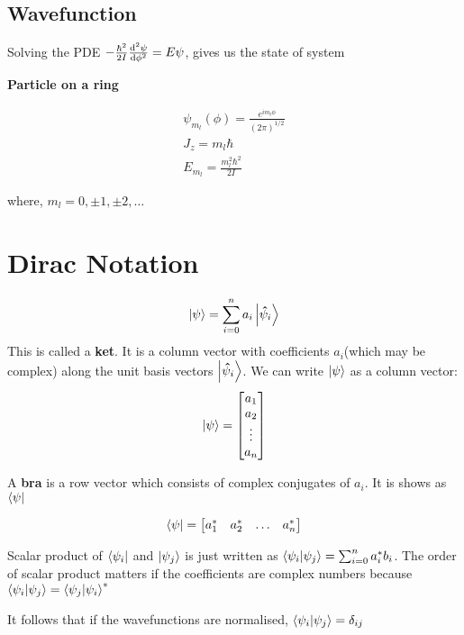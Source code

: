 \documentclass[11pt]{article}
\theoremstyle{definition}
\begin{document}
\subsection{Wavefunction}

Solving the PDE $-\frac{\hbar^2}{2I} \dv[2]{\psi}{\phi} = E\psi$, gives us the state of system

\begin{shaded}
\textbf{Particle on a ring}

\begin{gather*}
    \psi_{m_l}(\phi) = \frac{e^{i m_l \phi}}{(2\pi)^{1/2}}\\
    J_{z} = m_l \hbar \\
    E_{m_l} = \frac{m_l ^2 \hbar^2}{2I}
\end{gather*}

where, $m_l = 0, \pm 1, \pm 2, \dots$
\end{shaded}

\section{Dirac Notation}

\begin{equation*}
    \ket{\psi} = \sum_{i=0}^n a_{i}\ket{\vectorunit{\psi}_i}
\end{equation*}
This is called a \textbf{ket}. It is a column vector with coefficients $a_i$(which may be complex) along the unit basis vectors $\ket{\vectorunit{\psi}_i}$. We can write $\ket{\psi}$ as a column vector:
\begin{equation}
   \ket{\psi}= \mqty[a_1 \\ a_2 \\ \vdots \\ a_n]
\end{equation}

A \textbf{bra} is a row vector which consists of complex conjugates of $a_i$. It is shows as $\bra{\psi}$

\begin{equation}
   \bra{\psi}= \mqty[a_1^* & a_2^* & \dots & a_n^*]
\end{equation}

Scalar product of $\bra{\psi_i}$ and $\ket{\psi_j}$ is just written as $\bra{\psi_i}\ket{\psi_j} = \sum_{i=0}^n a_i^* b_i$. The order of scalar product matters if the coefficients are complex numbers because $\bra{\psi_i}\ket{\psi_j} =  \bra{\psi_j}\ket{\psi_i}^*$

It follows that if the wavefunctions are normalised,  $\bra{\psi_i}\ket{\psi_j} = \delta_{ij}$
\end{document}
